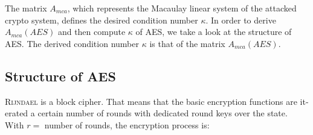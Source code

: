 \documentclass[a4paper,11pt]{article}
\begin{document}
\begin{otherlanguage}{english}
\noindent
The matrix $A_{mca}$, which represents the Macaulay linear system of the attacked crypto system, defines the desired condition number $\kappa$. In order to derive $A_{mca}(AES)$ and then compute $\kappa$ of \textsc{AES}, we take a look at the structure of \textsc{AES}. The derived condition number $\kappa$ is that of the matrix $A_{mca}(AES)$.


\subsection{Structure of \textsc{AES}}

\noindent
\textsc{Rijndael} is a block cipher. That means that the basic encryption functions are iterated a certain number of rounds with dedicated round keys over the state. With $r = $ number of rounds, the encryption process is:\\


\end{otherlanguage}
\end{document}
